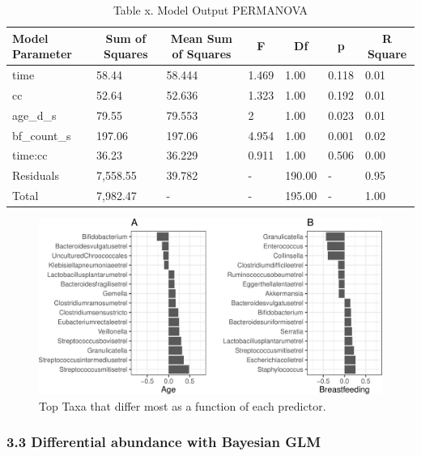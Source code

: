 \documentclass[,man]{apa6}
\begin{document}
\begin{table}[tbp]
\begin{center}
\begin{threeparttable}
\caption{\label{tab:unnamed-chunk-9}Table x. Model Output PERMANOVA}
\begin{tabular}{lllllll}
\toprule
Model Parameter & \multicolumn{1}{c}{Sum of Squares} & \multicolumn{1}{c}{Mean Sum of Squares} & \multicolumn{1}{c}{F} & \multicolumn{1}{c}{Df} & \multicolumn{1}{c}{p} & \multicolumn{1}{c}{R Square}\\
\midrule
time & 58.44 & 58.444 & 1.469 & 1.00 & 0.118 & 0.01\\
cc & 52.64 & 52.636 & 1.323 & 1.00 & 0.192 & 0.01\\
age\_d\_s & 79.55 & 79.553 & 2 & 1.00 & 0.023 & 0.01\\
bf\_count\_s & 197.06 & 197.06 & 4.954 & 1.00 & 0.001 & 0.02\\
time:cc & 36.23 & 36.229 & 0.911 & 1.00 & 0.506 & 0.00\\
Residuals & 7,558.55 & 39.782 & - & 190.00 & - & 0.95\\
Total & 7,982.47 & - & - & 195.00 & - & 1.00\\
\bottomrule
\end{tabular}
\end{threeparttable}
\end{center}
\end{table}

\begin{figure}
\centering
\includegraphics{index_files/figure-latex/unnamed-chunk-10-1.pdf}
\caption{\label{fig:unnamed-chunk-10}Top Taxa that differ most as a function
of each predictor.}
\end{figure}

\subsubsection{3.3 Differential abundance with Bayesian
GLM}\label{differential-abundance-with-bayesian-glm}
\end{document}
